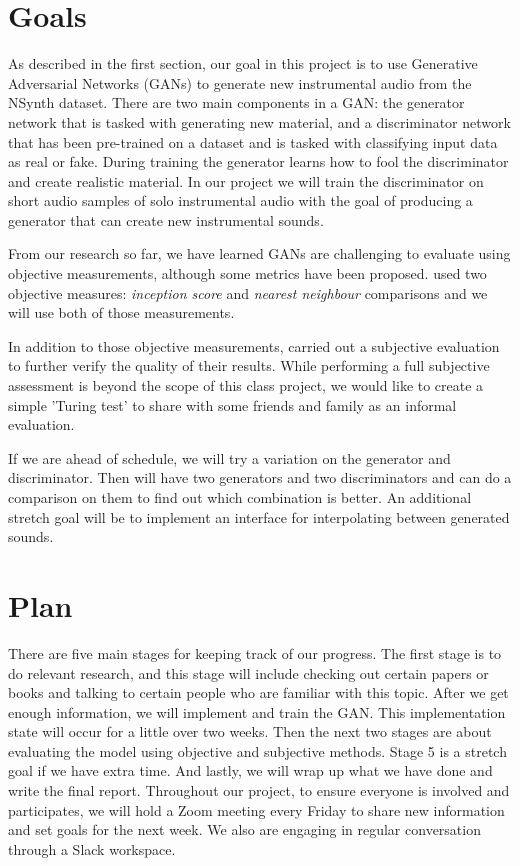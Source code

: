 \documentclass{article} %
\begin{document}
\section{Goals}
As described in the first section, our goal in this project is to use Generative Adversarial Networks (GANs) to generate new instrumental audio from the NSynth dataset. There are two main components in a GAN: the generator network that is tasked with generating new material, and a discriminator network that has been pre-trained on a dataset and is tasked with classifying input data as real or fake. During training the generator learns how to fool the discriminator and create realistic material. In our project we will train the discriminator on short audio samples of solo instrumental audio with the goal of producing a generator that can create new instrumental sounds.

From our research so far, we have learned GANs are challenging to evaluate using objective measurements, although some metrics have been proposed. \citet{donahue2018adversarial} used two objective measures: \emph{inception score} and \emph{nearest neighbour} comparisons and we will use both of those measurements.

In addition to those objective measurements, \citet{donahue2018adversarial} carried out a subjective evaluation to further verify the quality of their results. While performing a full subjective assessment is beyond the scope of this class project, we would like to create a simple 'Turing test' to share with some friends and family as an informal evaluation.

If we are ahead of schedule, we will try a variation on the generator and discriminator. Then will have two generators and two discriminators and can do a comparison on them to find out which combination is better. An additional stretch goal will be to implement an interface for interpolating between generated sounds.

\section{Plan}
There are five main stages for keeping track of our progress. The first stage is to do relevant research, and this stage will include checking out certain papers or books and talking to certain people who are familiar with this topic. After we get enough information, we will implement and train the GAN. This implementation state will occur for a little over two weeks. Then the next two stages are about evaluating the model using objective and subjective methods. Stage 5 is a stretch goal if we have extra time. And lastly, we will wrap up what we have done and write the final report. Throughout our project, to ensure everyone is involved and participates, we will hold a Zoom meeting every Friday to share new information and set goals for the next week. We also are engaging in regular conversation through a Slack workspace.
\end{document}
